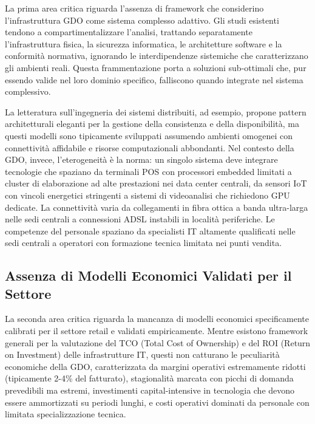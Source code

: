 La prima area critica riguarda l'assenza di framework che considerino l'infrastruttura GDO come sistema complesso adattivo. Gli studi esistenti tendono a compartimentalizzare l'analisi, trattando separatamente l'infrastruttura fisica, la sicurezza informatica, le architetture software e la conformità normativa, ignorando le interdipendenze sistemiche che caratterizzano gli ambienti reali. Questa frammentazione porta a soluzioni sub-ottimali che, pur essendo valide nel loro dominio specifico, falliscono quando integrate nel sistema complessivo.

La letteratura sull'ingegneria dei sistemi distribuiti, ad esempio, propone pattern architetturali eleganti per la gestione della consistenza e della disponibilità, ma questi modelli sono tipicamente sviluppati assumendo ambienti omogenei con connettività affidabile e risorse computazionali abbondanti. Nel contesto della GDO, invece, l'eterogeneità è la norma: un singolo sistema deve integrare tecnologie che spaziano da terminali POS con processori embedded limitati a cluster di elaborazione ad alte prestazioni nei data center centrali, da sensori IoT con vincoli energetici stringenti a sistemi di videoanalisi che richiedono GPU dedicate. La connettività varia da collegamenti in fibra ottica a banda ultra-larga nelle sedi centrali a connessioni ADSL instabili in località periferiche. Le competenze del personale spaziano da specialisti IT altamente qualificati nelle sedi centrali a operatori con formazione tecnica limitata nei punti vendita.

\subsection{Assenza di Modelli Economici Validati per il Settore}

La seconda area critica riguarda la mancanza di modelli economici specificamente calibrati per il settore retail e validati empiricamente. Mentre esistono framework generali per la valutazione del TCO (Total Cost of Ownership) e del ROI (Return on Investment) delle infrastrutture IT, questi non catturano le peculiarità economiche della GDO, caratterizzata da margini operativi estremamente ridotti (tipicamente 2-4\% del fatturato), stagionalità marcata con picchi di domanda prevedibili ma estremi, investimenti capital-intensive in tecnologia che devono essere ammortizzati su periodi lunghi, e costi operativi dominati da personale con limitata specializzazione tecnica.

